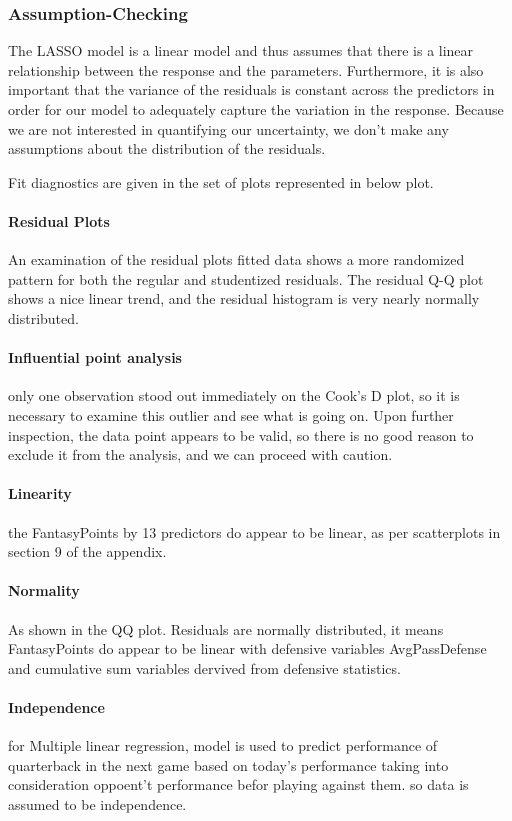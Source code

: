 \documentclass[american,]{article}
\let\oldparagraph\paragraph
\renewcommand{\paragraph}[1]{\oldparagraph{#1}\mbox{}}
\begin{document}
\subsubsection{Assumption-Checking}\label{assumption-checking}

The LASSO model is a linear model and thus assumes that there is a
linear relationship between the response and the parameters.
Furthermore, it is also important that the variance of the residuals is
constant across the predictors in order for our model to adequately
capture the variation in the response. Because we are not interested in
quantifying our uncertainty, we don't make any assumptions about the
distribution of the residuals.

Fit diagnostics are given in the set of plots represented in below plot.

\paragraph{Residual Plots} 
An examination of the residual plots fitted data shows a more randomized pattern for both the regular and studentized residuals.  The residual Q-Q plot shows a nice linear trend, and the residual histogram is very nearly normally distributed.
\paragraph{Influential point analysis}
only one observation stood out immediately on the Cook’s D plot, so it is necessary to examine this outlier and see what is going on.  Upon further inspection, the data point appears to be valid, so there is no good reason to exclude it from the analysis, and we can proceed with caution.
\paragraph{Linearity}
the FantasyPoints by 13 predictors do appear to be linear, as per scatterplots in section 9 of the appendix.
\paragraph{Normality}
As shown in the QQ plot. Residuals are normally distributed, it means FantasyPoints do appear to be linear with defensive variables AvgPassDefense and cumulative sum variables dervived from defensive statistics. 
\paragraph{Independence}
for Multiple linear regression, model is used to predict performance of quarterback in the next game based on today's performance taking into consideration 
oppoent't performance befor playing against them. so data is assumed to be independence.
\end{document}
